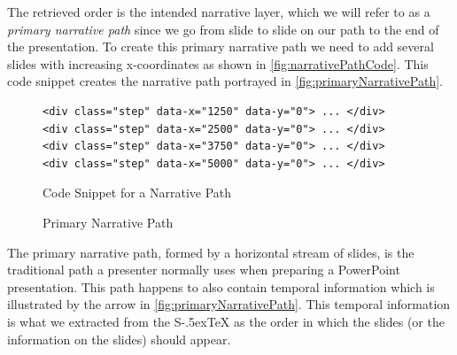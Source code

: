 \documentclass[twoside, 12pt]{article}
\def\stex{\texorpdfstring{\raisebox{-.5ex}S\kern-.5ex\TeX}{sTeX}\xspace}
\begin{document}
The retrieved order is the intended narrative layer, which we will refer to as a \textit{primary narrative path} since we go from slide to slide on our path to the end of the presentation. To create this primary narrative path we need to add several slides with increasing x-coordinates as shown in \autoref{fig:narrativePathCode}. This code snippet creates the narrative path portrayed in \autoref{fig:primaryNarrativePath}.\\

\begin{figure}
\vspace{-0pt}
\begin{verbatim}
<div class="step" data-x="1250" data-y="0"> ... </div>
<div class="step" data-x="2500" data-y="0"> ... </div>
<div class="step" data-x="3750" data-y="0"> ... </div>
<div class="step" data-x="5000" data-y="0"> ... </div>
\end{verbatim}
\vspace{-8pt}
  \caption{Code Snippet for a Narrative Path}
  \label{fig:narrativePathCode}
  \vspace{12pt}
\end{figure}

\begin{figure}
\vspace{-30pt}
  \begin{center}
  \end{center}
\vspace{-20pt}
  \caption{Primary Narrative Path}
  \label{fig:primaryNarrativePath}
\vspace{12pt}
\end{figure}

\begin{figure}
\vspace{-50pt}
\end{figure}

The primary narrative path, formed by a horizontal stream of slides, is the traditional path a presenter normally uses when preparing a PowerPoint presentation. This path happens to also contain temporal information which is illustrated by the arrow in \autoref{fig:primaryNarrativePath}. This temporal information is what we extracted from the \stex as the order in which the slides (or the information on the slides) should appear.\\
\end{document}

